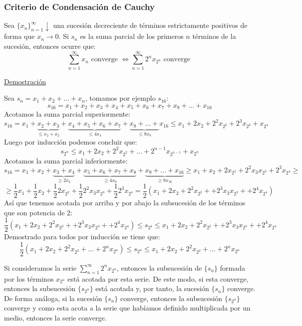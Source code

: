\documentclass[10pt,a4paper,openright]{book}
\begin{document}
\subsubsection*{Criterio de Condensación de Cauchy}
Sea $\{x_n\}_{n=1}^\infty \downarrow$ una sucesión decreciente de términos estrictamente positivos de forma que $x_n \rightarrow 0$. Si $s_n$ es la suma parcial de los primeros $n$ términos de la sucesión, entonces ocurre que:
$$\sum_{n=1}^{\infty} x_n \mbox{ converge } \Leftrightarrow \sum_{n=1}^{\infty} 2^n x_{2^n} \mbox{ converge }$$

\underline{Demostración}

Sea $s_n = x_1 + x_2 + \ldots + x_n$, tomamos por ejemplo $s_{16}$:
$$s_{16} = x_1 + x_2 + x_3 + x_4 + x_5 + x_6 + x_7 + x_8 + \ldots + x_{16}$$
Acotamos la suma parcial superiormente:
$$s_{16} = x_1 + \underbrace{x_2 + x_3}_{ \leq x_2 + x_2} + \underbrace{x_4 + x_5 + x_6 + x_7}_{\leq 4x_4} + \underbrace{x_8 + \ldots +}_{\leq 8x_8} x_{16} \leq x_1 + 2x_2 + 2^2 x_{2^2} + 2^3 x_{2^3} + x_{2^4}$$
Luego por inducción podemos concluir que:
$$s_{2^n} \leq x_1 + 2x_2 + 2^2 x_{2^2} + \ldots + 2^{n-1} x_{2^{n-1}}+ x_{2^n}$$
Acotamos la suma parcial inferiormente:
$$s_{16} = x_1 + x_2 +\underbrace{ x_3 + x_4}_{\geq 2x_4} + \underbrace{ x_5 + x_6 + x_7 + x_8}_{\geq 4x_8} + \underbrace{ x_9 + \ldots + x_{16}}_{\geq 8x_{16}}\geq x_1 + x_2 + 2 x_{2^2} + 2^2 x_3 x_{2^3} +  2^3 x_{2^4} \geq$$
$$\geq \frac{1}{2}  x_1 + \frac{1}{2} x_2 + \frac{1}{2} 2 x_{2^2} + \frac{1}{2} 2^2 x_3 x_{2^3} + \frac{1}{2} 2^3 x_{2^4} =\frac{1}{2} (x_1 + 2x_2 + 2^2 x_{2^2} + + 2^3 x_3 x_{2^3} + + 2^4 x_{2^4})$$
Así que tenemos acotada por arriba y por abajo la subsucesión de los términos que son potencia de 2:
$$\frac{1}{2} (x_1 + 2x_2 + 2^2 x_{2^2} + + 2^3 x_3 x_{2^3} + + 2^4 x_{2^4}) \leq s_{2^4} \leq x_1 + 2x_2 + 2^2 x_{2^2} + + 2^3 x_3 x_{2^3} + + 2^4 x_{2^4}$$
Demostrado para todos por inducción se tiene que:
$$\frac{1}{2} (x_1 + 2x_2 + 2^2 x_{2^2} + \ldots + 2^n x_{2^n}) \leq s_{2^n} \leq x_1 + 2x_2 + 2^2 x_{2^2} + \ldots + 2^n x_{2^n}$$

Si consideramos la serie $ \sum_{n=1}^{\infty} 2^n x_{2^n} $, entonces la subsucesión de $\{s_n\}$ formada por los términos $x_{2^n}$ está acotada por 
esta serie. De este modo, si esta converge, entonces la subsucesión $\{s_{2^n}\}$ está acotada y, por tanto, la sucesión $\{s_n\}$ converge. De forma análoga, si la sucesión $\{s_n\}$ converge, entonces la subsucesión $\{s_{2^n}\}$ converge y como esta acota a la serie que habíamos definido multiplicada por un medio, entonces la serie converge.
\end{document}
